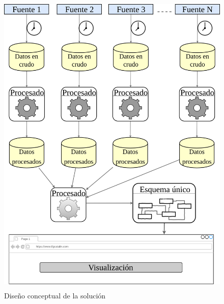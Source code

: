 \begin{figure}[H]
    \centering
    \includegraphics[width=1\textwidth,height=15cm,keepaspectratio]{Imagenes/disenyoconceptual}
    \caption{Diseño conceptual de la solución}
    \label{fig:disenyoconceptual}
\end{figure}


